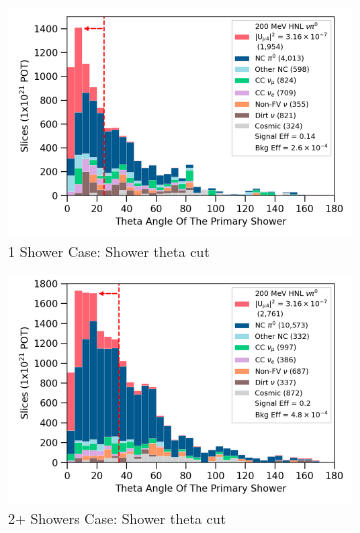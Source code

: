 \begin{figure}[h!]
        \begin{subfigure}[b]{0.495\textwidth}   
            \centering 
            \includegraphics[width=\textwidth]{one_shower_theta_precut}
            \caption{1 Shower Case: Shower theta cut}%
	    \label{fig:1shw_theta_cut}
        \end{subfigure}
        \hfill
        \begin{subfigure}[b]{0.495\textwidth}   
            \centering 
            \includegraphics[width=\textwidth]{two_shower_primary_theta_precut}
            \caption{2+ Showers Case: Shower theta cut}%
	    \label{fig:2shw_theta_cut}
        \end{subfigure}
        \hfill
	\centering
        \begin{subfigure}[b]{0.495\textwidth}   
            \centering 

\end{subfigure}
\end{figure}
